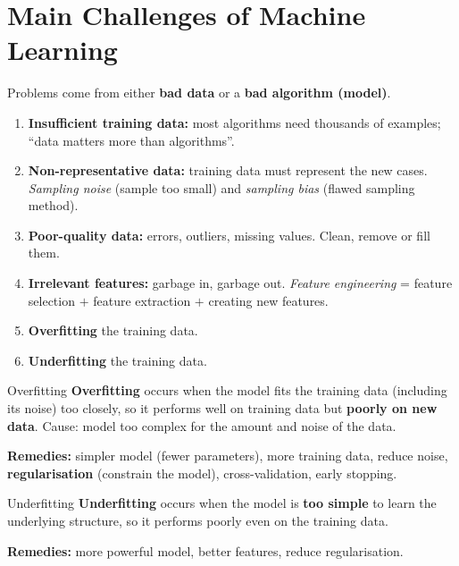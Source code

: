\section{Main Challenges of Machine Learning}
Problems come from either \textbf{bad data} or a \textbf{bad algorithm (model)}.

\begin{enumerate}
  \item \textbf{Insufficient training data:} most algorithms need thousands of examples; ``data matters more than algorithms''.
  \item \textbf{Non-representative data:} training data must represent the new cases. \emph{Sampling noise} (sample too small) and \emph{sampling bias} (flawed sampling method).
  \item \textbf{Poor-quality data:} errors, outliers, missing values. Clean, remove or fill them.
  \item \textbf{Irrelevant features:} garbage in, garbage out. \emph{Feature engineering} = feature selection $+$ feature extraction $+$ creating new features.
  \item \textbf{Overfitting} the training data.
  \item \textbf{Underfitting} the training data.
\end{enumerate}

\begin{dfn}{Overfitting}
\textbf{Overfitting} occurs when the model fits the training data (including its noise) too closely, so it performs well on training data but \textbf{poorly on new data}. Cause: model too complex for the amount and noise of the data.
\end{dfn}
\textbf{Remedies:} simpler model (fewer parameters), more training data, reduce noise, \textbf{regularisation} (constrain the model), cross-validation, early stopping.

\begin{dfn}{Underfitting}
\textbf{Underfitting} occurs when the model is \textbf{too simple} to learn the underlying structure, so it performs poorly even on the training data.
\end{dfn}
\textbf{Remedies:} more powerful model, better features, reduce regularisation.

